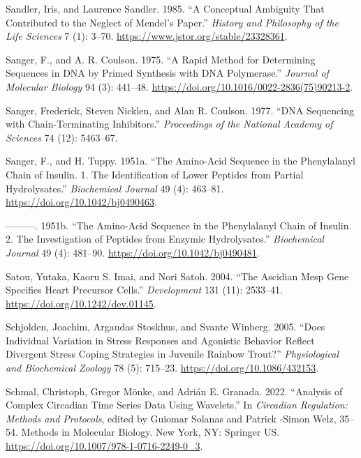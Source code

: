 \documentclass[
]{book}
\newlength{\cslhangindent}
\newlength{\cslentryspacingunit} %
\newenvironment{CSLReferences}[2] %
 {%
  \setlength{\parindent}{0pt}
  \ifodd #1
  \let\oldpar\par
  \def\par{\hangindent=\cslhangindent\oldpar}
  \fi
  \setlength{\parskip}{#2\cslentryspacingunit}
 }%
 {}
\begin{document}
\begin{CSLReferences}{1}{0}
\leavevmode{}%
Sandler, Iris, and Laurence Sandler. 1985. {``A {Conceptual Ambiguity} That {Contributed} to the {Neglect} of {Mendel}'s {Paper}.''} \emph{History and Philosophy of the Life Sciences} 7 (1): 3--70. \url{https://www.jstor.org/stable/23328361}.

\leavevmode{}%
Sanger, F., and A. R. Coulson. 1975. {``A Rapid Method for Determining Sequences in {DNA} by Primed Synthesis with {DNA} Polymerase.''} \emph{Journal of Molecular Biology} 94 (3): 441--48. \url{https://doi.org/10.1016/0022-2836(75)90213-2}.

\leavevmode{}%
Sanger, Frederick, Steven Nicklen, and Alan R. Coulson. 1977. {``{DNA} Sequencing with Chain-Terminating Inhibitors.''} \emph{Proceedings of the National Academy of Sciences} 74 (12): 5463--67.

\leavevmode{}%
Sanger, F., and H. Tuppy. 1951a. {``The Amino-Acid Sequence in the Phenylalanyl Chain of Insulin. 1. {The} Identification of Lower Peptides from Partial Hydrolysates.''} \emph{Biochemical Journal} 49 (4): 463--81. \url{https://doi.org/10.1042/bj0490463}.

\leavevmode{}%
---------. 1951b. {``The Amino-Acid Sequence in the Phenylalanyl Chain of Insulin. 2. {The} Investigation of Peptides from Enzymic Hydrolysates.''} \emph{Biochemical Journal} 49 (4): 481--90. \url{https://doi.org/10.1042/bj0490481}.

\leavevmode{}%
Satou, Yutaka, Kaoru S. Imai, and Nori Satoh. 2004. {``The Ascidian {Mesp} Gene Specifies Heart Precursor Cells.''} \emph{Development} 131 (11): 2533--41. \url{https://doi.org/10.1242/dev.01145}.

\leavevmode{}%
Schjolden, Joachim, Argaudas Stoskhus, and Svante Winberg. 2005. {``Does {Individual Variation} in {Stress Responses} and {Agonistic Behavior Reflect Divergent Stress Coping Strategies} in {Juvenile Rainbow Trout}?''} \emph{Physiological and Biochemical Zoology} 78 (5): 715--23. \url{https://doi.org/10.1086/432153}.

\leavevmode{}%
Schmal, Christoph, Gregor Mönke, and Adrián E. Granada. 2022. {``Analysis of {Complex Circadian Time Series Data Using Wavelets}.''} In \emph{Circadian {Regulation}: {Methods} and {Protocols}}, edited by Guiomar Solanas and Patrick -Simon Welz, 35--54. Methods in {Molecular Biology}. {New York, NY}: {Springer US}. \url{https://doi.org/10.1007/978-1-0716-2249-0_3}.


\end{CSLReferences}
\end{document}
